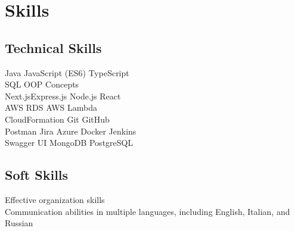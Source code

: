 
\section{Skills}
\subsection{Technical Skills}
\smallsep
{}
\smallsep
Java \textbullet{}
JavaScript (ES6) \textbullet{} TypeScript\\   SQL \textbullet{} OOP Concepts
\mediumsep \\
\smallsep
Next.js\textbullet{}Express.js \textbullet{} Node.js \textbullet{} React
\mediumsep \\
\smallsep
AWS RDS \textbullet {} AWS Lambda \\CloudFormation \textbullet{}
Git \textbullet{} GitHub \\ Postman \textbullet{} Jira \textbullet {}Azure \textbullet{} Docker \textbullet{} Jenkins \\Swagger UI \textbullet{}MongoDB \textbullet{} PostgreSQL
\sectionsep
\subsection{Soft Skills}
\smallsep
Effective organization skills\\Communication abilities in multiple languages, including English, Italian, and Russian
\sectionsep